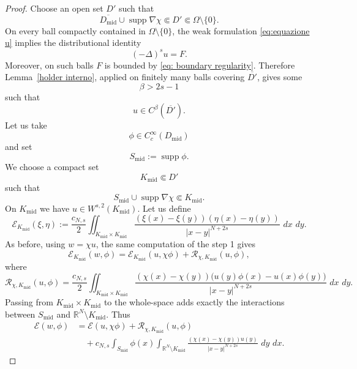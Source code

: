 \documentclass[11pt,a4paper]{article}
\newcommand{\dd}{\,d}
\newcommand{\supp}{\operatorname{supp}}
\begin{document}
\begin{proof}
Choose an open set \(D'\) such that
\[
\overline{D_{\mathrm{mid}}}\cup\supp\nabla\chi
\Subset D'\Subset\Omega\setminus\{0\}.
\]
On every ball compactly contained in \(\Omega\setminus\{0\}\), the weak formulation \eqref{eq:equazione u} implies the distributional identity
\[
(-\Delta)^s u=F.
\]
Moreover, on such balls \(F\) is bounded by \eqref{eq: boundary regularity}. Therefore
Lemma~\ref{holder interno}, applied on finitely many balls
covering \(\overline{D'}\), gives some
\[
\beta>2s-1
\]
such that
\[
u\in C^\beta(\overline{D'}).
\]
Let us take
\[
\phi\in C_c^\infty(D_{\mathrm{mid}})
\]
and set
\[
S_{\mathrm{mid}}:=\supp\phi.
\]
We choose a compact set
\[
K_{\mathrm{mid}}\Subset D'
\]
such that
\[
S_{\mathrm{mid}}\cup\supp\nabla\chi\Subset K_{\mathrm{mid}}.
\]
On \(K_{\mathrm{mid}}\) we have \(u\in W^{s,2}(K_{\mathrm{mid}})\). Let us define
\[
\mathcal E_{K_{\mathrm{mid}}}(\xi,\eta)
:=
\frac{c_{N,s}}2
\iint_{K_{\mathrm{mid}}\times K_{\mathrm{mid}}}
\frac{(\xi(x)-\xi(y))(\eta(x)-\eta(y))}
{|x-y|^{N+2s}}\,\dd x\,\dd y.
\]
As before, using \(w=\chi u\), the same computation of the step 1 gives
\[
\mathcal E_{K_{\mathrm{mid}}}(w,\phi)
=
\mathcal E_{K_{\mathrm{mid}}}(u,\chi\phi)
+
\mathcal R_{\chi,K_{\mathrm{mid}}}(u,\phi),
\]
where
\[
\mathcal R_{\chi,K_{\mathrm{mid}}}(u,\phi)
=
\frac{c_{N,s}}2
\iint_{K_{\mathrm{mid}}\times K_{\mathrm{mid}}}
\frac{
(\chi(x)-\chi(y))
\bigl(u(y)\phi(x)-u(x)\phi(y)\bigr)}
{|x-y|^{N+2s}}
\,\dd x\,\dd y.
\]
Passing from \(K_{\mathrm{mid}}\times K_{\mathrm{mid}}\) to the whole-space
adds exactly the interactions between \(S_{\mathrm{mid}}\) and
\(\mathbb R^N\setminus K_{\mathrm{mid}}\). Thus
\[
\begin{aligned}
\mathcal E(w,\phi)
&=
\mathcal E(u,\chi\phi)
+
\mathcal R_{\chi,K_{\mathrm{mid}}}(u,\phi)\\
&\quad+
c_{N,s}
\int_{S_{\mathrm{mid}}}\phi(x)
\int_{\mathbb R^N\setminus K_{\mathrm{mid}}}
\frac{(\chi(x)-\chi(y))u(y)}
{|x-y|^{N+2s}}
\,\dd y\,\dd x.
\end{aligned}
\]


\end{proof}
\end{document}
